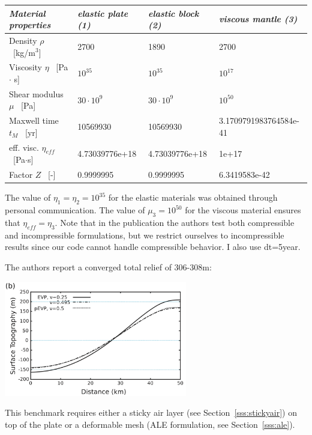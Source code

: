 \begin{center}
\begin{tabular}{llll}
\hline 
\textit{Material properties}& \textit{elastic plate (1)}  & \textit{elastic block (2)} & \textit{viscous mantle (3)} \\
\hline 
\hline 
Density         $\rho$       \ [kg/m$^{3}$]       & 2700&1890 &2700 \\ 
Viscosity       $\eta$       \ [Pa$\cdot$ s]      & $10^{35}$& $10^{35}$ & $10^{17}$ \\ 
Shear modulus   $\mu $       \ [Pa]               & $30\cdot10^9$& $30\cdot10^9$&  $10^{50}$ \\
Maxwell time    $t_M$        \ [yr]               & 10569930 &  10569930 & 3.1709791983764584e-41 \\ 
eff. visc.      $\eta_{eff}$ \ [Pa$\cdot$s]       & 4.73039776e+18& 4.73039776e+18&  1e+17\\ 
Factor          $Z$          \ [-]                & 0.9999995&  0.9999995 &  6.3419583e-42 \\ 
\hline 
\end{tabular} 
\end{center}

The value of $\eta_1=\eta_2=10^{35}$ for the elastic materials was obtained through personal communication. 
The value of $\mu_3=10^{50}$ for the viscous material ensures that $\eta_{eff}=\eta_3$.
Note that in the publication the authors test both compressible and incompressible 
formulations, but we restrict ourselves to incompressible results since our code cannot handle compressible behavior. 
I also use dt=5year.

The authors report a converged total relief of 306-308m:

\begin{center}
\includegraphics[width=8cm]{python_codes/fieldstone_64/images/chtl13b}
\end{center}

This benchmark requires either a sticky air layer (see Section~\ref{sss:stickyair})
on top of the plate or a deformable mesh (ALE formulation, see Section~\ref{sss:ale}).


